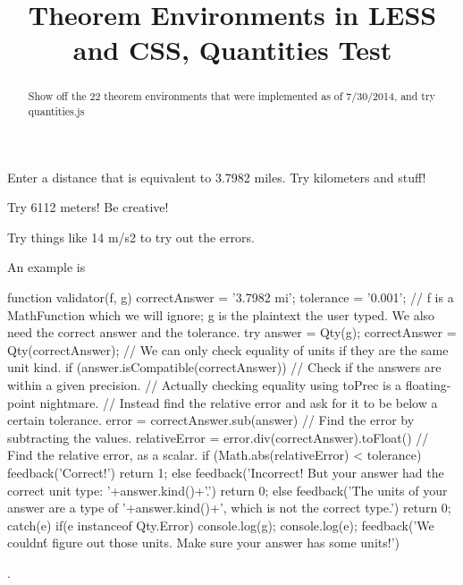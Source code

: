 \documentclass{ximera}
\begin{document}
\begin{abstract}
Show off the 22 theorem environments that were implemented as of 7/30/2014, and try quantities.js
\end{abstract}

\title{Theorem Environments in LESS and CSS, Quantities Test}


\begin{exercise}
Enter a distance that is equivalent to 3.7982 miles. Try kilometers and stuff!

\begin{solution}
\begin{hint}
Try 6112 meters! Be creative!
\end{hint}
\begin{hint}
Try things like 14 m/s2 to try out the errors.
\end{hint}
An example is \begin{expression-answer}
	
	
	function validator(f, g) {
		correctAnswer = '3.7982 mi';
		tolerance = '0.001';
		// f is a MathFunction which we will ignore; g is the plaintext the user typed. We also need the correct answer and the tolerance.		
		try {
			answer = Qty(g);
			correctAnswer = Qty(correctAnswer);   
			// We can only check equality of units if they are the same unit kind.
			if (answer.isCompatible(correctAnswer))
			{
				// Check if the answers are within a given precision. 
				// Actually checking equality using toPrec is a floating-point nightmare.
				// Instead find the relative error and ask for it to be below a certain tolerance.
				error = correctAnswer.sub(answer)		 	// Find the error by subtracting the values.
				relativeError = error.div(correctAnswer).toFloat()  // Find the relative error, as a scalar.
				if (Math.abs(relativeError) < tolerance) {
					feedback('Correct!')
					return 1;
				} else {
					feedback('Incorrect! But your answer had the correct unit type: '+answer.kind()+'.')
					return 0;
				}
			} else {
				feedback('The units of your answer are a type of '+answer.kind()+', which is not the correct type.')
				return 0;
			}
		}
		catch(e) {
		  if(e instanceof Qty.Error) {
			console.log(g);
			console.log(e);
			feedback('We couldn\'t figure out those units. Make sure your answer has some units!')
		  }
		}
	}

	

\end{expression-answer}.
\end{solution}

\end{exercise}
\end{document}
